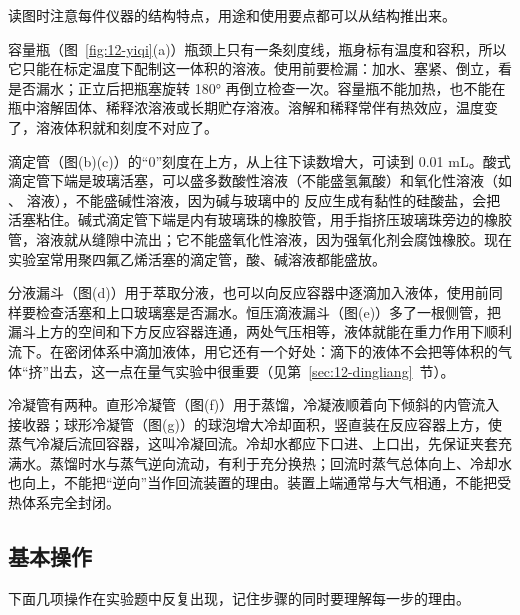 读图时注意每件仪器的结构特点，用途和使用要点都可以从结构推出来。

容量瓶（图~\ref{fig:12-yiqi}(a)）瓶颈上只有一条刻度线，瓶身标有温度和容积，所以它只能在标定温度下配制这一体积的溶液。使用前要检漏：加水、塞紧、倒立，看是否漏水；正立后把瓶塞旋转 180° 再倒立检查一次。容量瓶不能加热，也不能在瓶中溶解固体、稀释浓溶液或长期贮存溶液。溶解和稀释常伴有热效应，温度变了，溶液体积就和刻度不对应了。

滴定管（图(b)(c)）的“0”刻度在上方，从上往下读数增大，可读到 0.01 mL。酸式滴定管下端是玻璃活塞，可以盛多数酸性溶液（不能盛氢氟酸）和氧化性溶液（如 、 溶液），不能盛碱性溶液，因为碱与玻璃中的  反应生成有黏性的硅酸盐，会把活塞粘住。碱式滴定管下端是内有玻璃珠的橡胶管，用手指挤压玻璃珠旁边的橡胶管，溶液就从缝隙中流出；它不能盛氧化性溶液，因为强氧化剂会腐蚀橡胶。现在实验室常用聚四氟乙烯活塞的滴定管，酸、碱溶液都能盛放。

分液漏斗（图(d)）用于萃取分液，也可以向反应容器中逐滴加入液体，使用前同样要检查活塞和上口玻璃塞是否漏水。恒压滴液漏斗（图(e)）多了一根侧管，把漏斗上方的空间和下方反应容器连通，两处气压相等，液体就能在重力作用下顺利流下。在密闭体系中滴加液体，用它还有一个好处：滴下的液体不会把等体积的气体“挤”出去，这一点在量气实验中很重要（见第~\ref{sec:12-dingliang}~节）。

冷凝管有两种。直形冷凝管（图(f)）用于蒸馏，冷凝液顺着向下倾斜的内管流入接收器；球形冷凝管（图(g)）的球泡增大冷却面积，竖直装在反应容器上方，使蒸气冷凝后流回容器，这叫冷凝回流。冷却水都应下口进、上口出，先保证夹套充满水。蒸馏时水与蒸气逆向流动，有利于充分换热；回流时蒸气总体向上、冷却水也向上，不能把“逆向”当作回流装置的理由。装置上端通常与大气相通，不能把受热体系完全封闭。

\subsection{基本操作}

下面几项操作在实验题中反复出现，记住步骤的同时要理解每一步的理由。

